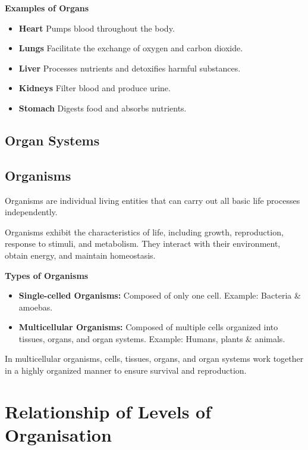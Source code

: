 \documentclass{article}
\begin{document}
\textbf{Examples of Organs}
\begin{itemize}
    \item \textbf{Heart} Pumps blood throughout the body.
    \item \textbf{Lungs} Facilitate the exchange of oxygen and carbon dioxide.
    \item \textbf{Liver} Processes nutrients and detoxifies harmful substances.
    \item \textbf{Kidneys} Filter blood and produce urine.
    \item \textbf{Stomach} Digests food and absorbs nutrients.
    \cite{a2016_europe}
\end{itemize}

\subsection{Organ Systems}

\subsection{Organisms}
Organisms are individual living entities that can carry out all basic life processes independently.

Organisms exhibit the characteristics of life, including growth, reproduction, response to stimuli, and metabolism.
They interact with their environment, obtain energy, and maintain homeostasis.

\textbf{Types of Organisms}
\begin{itemize}
    \item \textbf{Single-celled Organisms:} Composed of only one cell. Example: Bacteria \& amoebas.
    \item \textbf{Multicellular Organisms:} Composed of multiple cells organized into tissues, organs, and organ systems. Example: Humans, plants \& animals.
\end{itemize}

In multicellular organisms, cells, tissues, organs, and organ systems work together in a highly organized manner to ensure survival and reproduction. \cite{a2016_europe}

\section{Relationship of Levels of Organisation}
\end{document}
